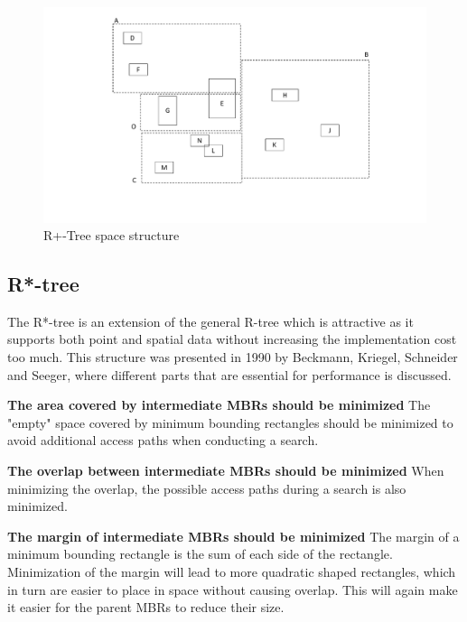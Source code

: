 \begin{figure}[ht]
    \centering
    \includegraphics[scale=0.35]{figures/RPlusTree_space.pdf}
    \caption{R+-Tree space structure}
    \label{fig:RplusTreeSpace}
\end{figure}

\subsection{R*-tree}
The R*-tree is an extension of the general R-tree which is attractive as it supports both point and spatial data without increasing the implementation cost too much. This structure was presented in 1990 by Beckmann, Kriegel, Schneider and Seeger\cite{R*-tree}, where different parts that are essential for performance is discussed.\newline

\noindent
\textbf{The area covered by intermediate MBRs should be minimized}\newline
The "empty" space covered by minimum bounding rectangles should be minimized to avoid additional access paths when conducting a search. \newline

\noindent
\textbf{The overlap between intermediate MBRs should be minimized}\newline
When minimizing the overlap, the possible access paths during a search is also minimized. \newline

\noindent
\textbf{The margin of intermediate MBRs should be minimized}\newline
The margin of a minimum bounding rectangle is the sum of each side of the rectangle. Minimization of the margin will lead to more quadratic shaped rectangles, which in turn are easier to place in space without causing overlap. This will again make it easier for the parent MBRs to reduce their size. \newline

